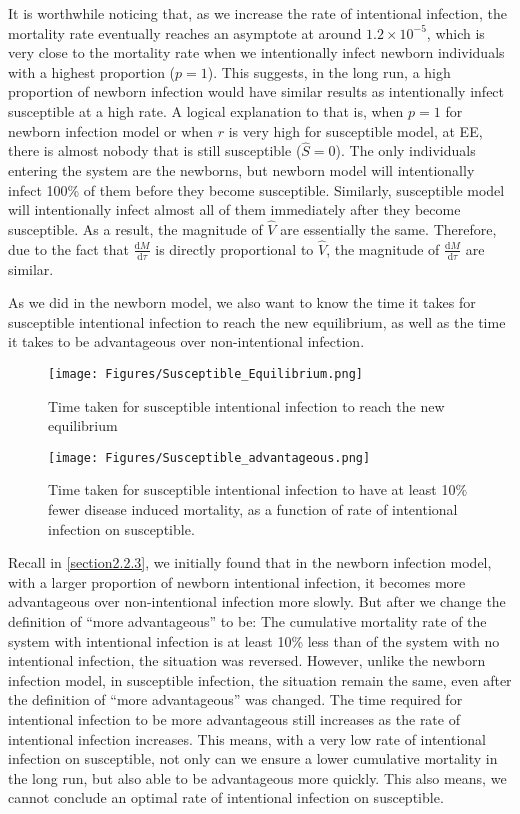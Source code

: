 \documentclass[12pt]{article}
\newcommand\dbyd[2]{\frac{\mathrm d{#1}}{\mathrm d{#2}}}
\begin{document}
It is worthwhile noticing that, as we increase the rate of intentional infection, the mortality rate eventually reaches an asymptote at around $1.2\times10^{-5}$, which is very close to the mortality rate when we intentionally infect newborn individuals with a highest proportion ($p=1$). This suggests, in the long run, a high proportion of newborn infection would have similar results as intentionally infect susceptible at a high rate. A logical explanation to that is, when $p=1$ for newborn infection model or when $r$ is very high for susceptible model, at EE, there is almost nobody that is still susceptible ($\hat{S}=0$). The only individuals entering the system are the newborns, but newborn model will intentionally infect 100\% of them before they become susceptible. Similarly, susceptible model will intentionally infect almost all of them immediately after they become susceptible. As a result, the magnitude of $\hat{V}$ are essentially the same. Therefore, due to the fact that $\dbyd{M}{\tau}$ is directly proportional to $\hat{V}$, the magnitude of $\dbyd{M}{\tau}$ are similar.

As we did in the newborn model, we also want to know the time it takes for susceptible intentional infection to reach the new equilibrium, as well as the time it takes to be advantageous over non-intentional infection.

\begin{figure}[H]
  \centering
  \texttt{[image: Figures/Susceptible\_Equilibrium.png]}
  \caption{Time taken for susceptible intentional infection to reach the new equilibrium}
\end{figure}

\begin{figure}[H]
  \centering
  \texttt{[image: Figures/Susceptible\_advantageous.png]}
  \caption{Time taken for susceptible intentional infection to have at least 10$\%$ fewer disease induced mortality, as a function of rate of intentional infection on susceptible.}
\end{figure}

Recall in \autoref{section2.2.3}, we initially found that in the newborn infection model, with a larger proportion of newborn intentional infection, it becomes more advantageous over non-intentional infection more slowly. But after we change the definition of ``more advantageous'' to be: The cumulative mortality rate of the system with intentional infection is at least 10\% less than of the system with no intentional infection, the situation was reversed. However, unlike the newborn infection model, in susceptible infection, the situation remain the same, even after the definition of ``more advantageous'' was changed. The time required for intentional infection to be more advantageous still increases as the rate of intentional infection increases. This means, with a very low rate of intentional infection on susceptible, not only can we ensure a lower cumulative mortality in the long run, but also able to be advantageous more quickly. This also means, we cannot conclude an optimal rate of intentional infection on susceptible.
\end{document}
